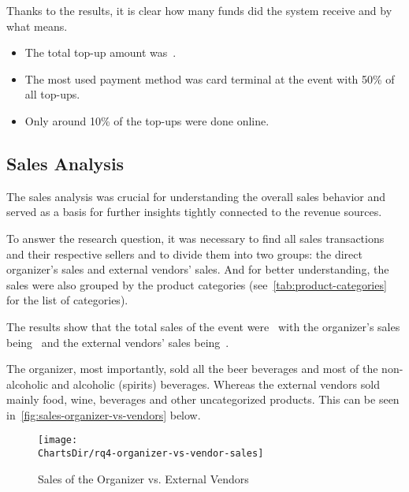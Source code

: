 Thanks to the results, it is clear how many funds did the system receive and by what means.

\begin{keytakeaways}
	\begin{itemize}
		\item The total top-up amount was~.
		\item The most used payment method was card terminal at the event with 50\% of all top-ups.
		\item Only around 10\% of the top-ups were done online.
	\end{itemize}
\end{keytakeaways}


\subsection{Sales Analysis}
\label{subsec:analysis-sales}


The sales analysis was crucial for understanding the overall sales behavior and served as a basis for further insights tightly connected to the revenue sources.

To answer the research question, it was necessary to find all sales transactions and their respective sellers and to divide them into two groups: the direct organizer's sales and external vendors' sales.
And for better understanding, the sales were also grouped by the product categories (see~\autoref{tab:product-categories} for the list of categories).

The results show that the total sales of the event were~ with the organizer's sales being~ and the external vendors' sales being~.

The organizer, most importantly, sold all the beer beverages and most of the non-alcoholic and alcoholic (spirits) beverages.
Whereas the external vendors sold mainly food, wine, beverages and other uncategorized products.
This can be seen in~\autoref{fig:sales-organizer-vs-vendors} below.

\begin{figure}[H]
	\centering
	\texttt{[image: \\ChartsDir/rq4-organizer-vs-vendor-sales]}
	\caption{ Sales of the Organizer vs. External Vendors}
	\label{fig:sales-organizer-vs-vendors}
	\source
\end{figure}

